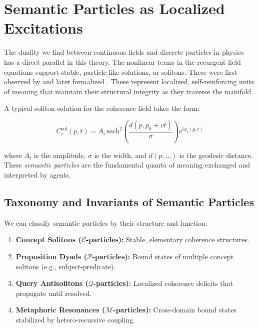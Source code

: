 
\section{Semantic Particles as Localized Excitations}
\label{13.6:semantic_particles_as_localized_excitations}

The duality we find between continuous fields and discrete particles in physics has a direct parallel in this theory. The nonlinear terms in the recurgent field equations support stable, particle-like solutions, or solitons. These were first observed by \autocite{Russell1845} and later formalized \autocite{KortewegdeVries1895, ZabuskyKruskal1965}. These represent localized, self-reinforcing units of meaning that maintain their structural integrity as they traverse the manifold.

A typical soliton solution for the coherence field takes the form:

\begin{equation}
C_i^{\mathrm{sol}}(p, t) = A_i\, \mathrm{sech}^2\left(\frac{d(p, p_0 + vt)}{\sigma}\right) e^{i\phi_i(p, t)}
\end{equation}

where \(A_i\) is the amplitude, \(\sigma\) is the width, and \(d(p, \dots)\) is the geodesic distance. These \textit{semantic particles} are the fundamental quanta of meaning exchanged and interpreted by agents.


\subsection{Taxonomy and Invariants of Semantic Particles}
\label{13.6.1:taxonomy_and_invariants_of_semantic_particles}

We can classify semantic particles by their structure and function:

\begin{enumerate}

    \item \textbf{Concept Solitons (\(\mathcal{C}\)-particles):} Stable, elementary coherence structures.

    \item \textbf{Proposition Dyads (\(\mathcal{P}\)-particles):} Bound states of multiple concept solitons (e.g., subject-predicate).

    \item \textbf{Query Antisolitons (\(\mathcal{Q}\)-particles):} Localized coherence deficits that propagate until resolved.

    \item \textbf{Metaphoric Resonances (\(\mathcal{M}\)-particles):} Cross-domain bound states stabilized by hetero-recursive coupling.

\end{enumerate}


